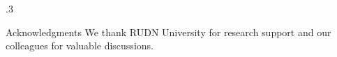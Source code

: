 \documentclass[xcolor={svgnames}]{beamer}
\begin{document}
\begin{frame}
\begin{columns}
\begin{column}{.3\textwidth}
\begin{block}{Acknowledgments}
We thank RUDN University for research support and our colleagues for valuable discussions.
\end{block}
\end{column}
\end{columns}
\end{frame}
\end{document}
